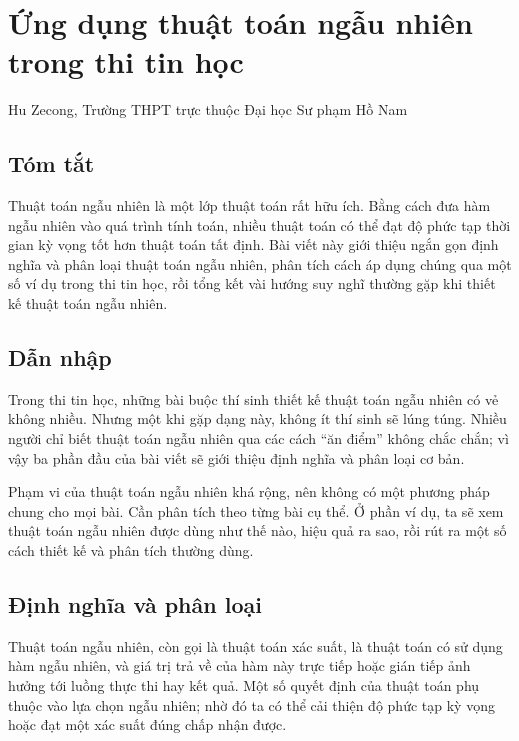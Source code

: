 \documentclass[11pt]{article}
\begin{document}
\section{Ứng dụng thuật toán ngẫu nhiên trong thi tin học}

\begin{center}
Hu Zecong, Trường THPT trực thuộc Đại học Sư phạm Hồ Nam
\end{center}

\subsection*{Tóm tắt}

Thuật toán ngẫu nhiên là một lớp thuật toán rất hữu ích. Bằng cách đưa hàm ngẫu
nhiên vào quá trình tính toán, nhiều thuật toán có thể đạt độ phức tạp thời gian
kỳ vọng tốt hơn thuật toán tất định. Bài viết này giới thiệu ngắn gọn định
nghĩa và phân loại thuật toán ngẫu nhiên, phân tích cách áp dụng chúng qua một
số ví dụ trong thi tin học, rồi tổng kết vài hướng suy nghĩ thường gặp khi thiết
kế thuật toán ngẫu nhiên.

\subsection{Dẫn nhập}

Trong thi tin học, những bài buộc thí sinh thiết kế thuật toán ngẫu nhiên có vẻ
không nhiều. Nhưng một khi gặp dạng này, không ít thí sinh sẽ lúng túng. Nhiều
người chỉ biết thuật toán ngẫu nhiên qua các cách ``ăn điểm'' không chắc chắn;
vì vậy ba phần đầu của bài viết sẽ giới thiệu định nghĩa và phân loại cơ bản.

Phạm vi của thuật toán ngẫu nhiên khá rộng, nên không có một phương pháp chung
cho mọi bài. Cần phân tích theo từng bài cụ thể. Ở phần ví dụ, ta sẽ xem thuật
toán ngẫu nhiên được dùng như thế nào, hiệu quả ra sao, rồi rút ra một số cách
thiết kế và phân tích thường dùng.

\subsection{Định nghĩa và phân loại}

Thuật toán ngẫu nhiên, còn gọi là thuật toán xác suất, là thuật toán có sử dụng
hàm ngẫu nhiên, và giá trị trả về của hàm này trực tiếp hoặc gián tiếp ảnh
hưởng tới luồng thực thi hay kết quả. Một số quyết định của thuật toán phụ
thuộc vào lựa chọn ngẫu nhiên; nhờ đó ta có thể cải thiện độ phức tạp kỳ vọng
hoặc đạt một xác suất đúng chấp nhận được.
\end{document}
